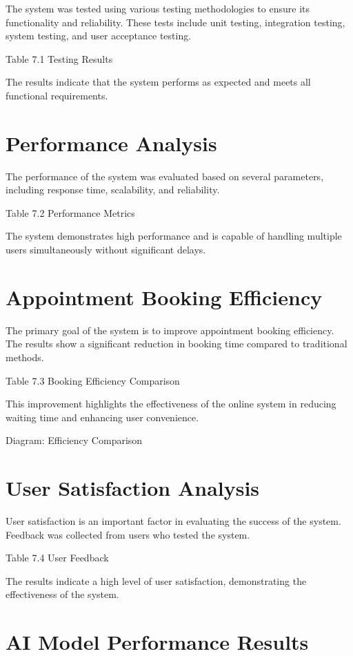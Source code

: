 The system was tested using various testing methodologies to ensure its functionality and reliability. These tests include unit testing, integration testing, system testing, and user acceptance testing.

Table 7.1 Testing Results

The results indicate that the system performs as expected and meets all functional requirements.

\section{Performance Analysis}

The performance of the system was evaluated based on several parameters, including response time, scalability, and reliability.

Table 7.2 Performance Metrics

The system demonstrates high performance and is capable of handling multiple users simultaneously without significant delays.

\section{Appointment Booking Efficiency}

The primary goal of the system is to improve appointment booking efficiency. The results show a significant reduction in booking time compared to traditional methods.

Table 7.3 Booking Efficiency Comparison

This improvement highlights the effectiveness of the online system in reducing waiting time and enhancing user convenience.

Diagram: Efficiency Comparison

\section{User Satisfaction Analysis}

User satisfaction is an important factor in evaluating the success of the system. Feedback was collected from users who tested the system.

Table 7.4 User Feedback

The results indicate a high level of user satisfaction, demonstrating the effectiveness of the system.

\section{AI Model Performance Results}


